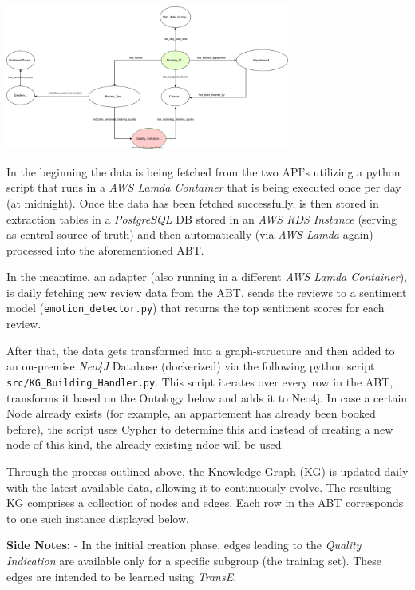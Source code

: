 \documentclass[
]{article}
\makeatletter
\newcommand*\pandocbounded[1]{%
  \sbox\pandoc@box{#1}%
  \Gscale@div\@tempa{\textheight}{\dimexpr\ht\pandoc@box+\dp\pandoc@box\relax}%
  \Gscale@div\@tempb{\linewidth}{\wd\pandoc@box}%
  \ifdim\@tempb\p@<\@tempa\p@\let\@tempa\@tempb\fi%
  \ifdim\@tempa\p@<\p@\scalebox{\@tempa}{\usebox\pandoc@box}%
  \else\usebox{\pandoc@box}%
  \fi%
}
\makeatother
\begin{document}
\begin{center}
  \includegraphics[width=0.7\textwidth]{drawings/Application_Architecture.png}
\end{center}
\pagebreak

In the beginning the data is being fetched from the two API's utilizing
a python script that runs in a \emph{AWS Lamda Container} that is being
executed once per day (at midnight). Once the data has been fetched
successfully, is then stored in extraction tables in a \emph{PostgreSQL}
DB stored in an \emph{AWS RDS Instance} (serving as central source of
truth) and then automatically (via \emph{AWS Lamda} again) processed
into the aforementioned ABT.

In the meantime, an adapter (also running in a different \emph{AWS Lamda
Container}), is daily fetching new review data from the ABT, sends the
reviews to a sentiment model (\texttt{emotion\_detector.py}) that
returns the top sentiment scores for each review.

After that, the data gets transformed into a graph-structure and then
added to an on-premise \emph{Neo4J} Database (dockerized) via the
following python script \texttt{src/KG\_Building\_Handler.py}. This
script iterates over every row in the ABT, transforms it based on the
Ontology below and adds it to Neo4j. In case a certain Node already
exists (for example, an appartement has already been booked before), the
script uses Cypher to determine this and instead of creating a new node
of this kind, the already existing ndoe will be used.

Through the process outlined above, the Knowledge Graph (KG) is updated
daily with the latest available data, allowing it to continuously
evolve. The resulting KG comprises a collection of nodes and edges. Each
row in the ABT corresponds to one such instance displayed below.


\pandocbounded{}


\textbf{Side Notes:} - In the initial creation phase, edges leading to
the \emph{Quality Indication} are available only for a specific subgroup
(the training set). These edges are intended to be learned using
\emph{TransE}.
\end{document}
